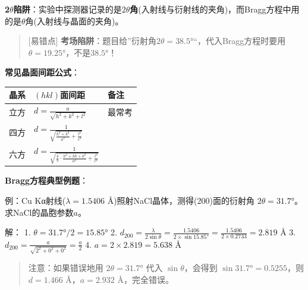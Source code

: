 \documentclass[a4paper,11pt]{ctexart}
\newcounter{none}
\newcommand{\箭}{\ensuremath{\rightarrow}}
\newcommand{\左箭}{\ensuremath{\leftarrow}}
\newcommand{\上箭}{\ensuremath{\uparrow}}
\newcommand{\下箭}{\ensuremath{\downarrow}}
\newcommand{\衡}{\ensuremath{\rightleftharpoons}}
\newcommand{\双箭}{\ensuremath{\leftrightarrow}}
\newcommand{\约等于}{\ensuremath{\approx}}
\newcommand{\小于等于}{\ensuremath{\leq}}
\newcommand{\大于等于}{\ensuremath{\geq}}
\newcommand{\不等于}{\ensuremath{\neq}}
\newcommand{\西格马}{\ensuremath{\sigma}}
\newcommand{\派}{\ensuremath{\pi}}
\begin{document}
\textbf{2\(\theta\)陷阱}：实验中探测器记录的是\textbf{\(2\theta\)角}(入射线与衍射线的夹角)，而Bragg方程中用的是\(\theta\)角(入射线与晶面的夹角)。

\begin{quote}
{[}易错点{]} \textbf{考场陷阱}：题目给''衍射角\(2\theta = 38.5°\)``，代入Bragg方程时要用\(\theta = 19.25°\)，不是\(38.5°\)！
\end{quote}

\textbf{常见晶面间距公式}：

{\def\LTcaptype{none} %
\begin{longtable}[]{@{}
  >{\raggedright\arraybackslash}p{}
  >{\raggedright\arraybackslash}p{}
  >{\raggedright\arraybackslash}p{}@{}}
\toprule\noalign{}
\begin{minipage}[b]{\linewidth}\raggedright
晶系
\end{minipage} & \begin{minipage}[b]{\linewidth}\raggedright
\((hkl)\)面间距
\end{minipage} & \begin{minipage}[b]{\linewidth}\raggedright
备注
\end{minipage} \\
\midrule\noalign{}
\endhead
\bottomrule\noalign{}
\endlastfoot
立方 & \(d = \frac{a}{\sqrt{h^2+k^2+l^2}}\) & 最常考 \\
四方 & \(d = \frac{1}{\sqrt{\frac{h^2+k^2}{a^2}+\frac{l^2}{c^2}}}\) & \\
六方 & \(d = \frac{1}{\sqrt{\frac{4}{3}\cdot\frac{h^2+hk+k^2}{a^2}+\frac{l^2}{c^2}}}\) & \\
\end{longtable}
}

\textbf{Bragg方程典型例题}：

例：Cu Kα射线(\(\lambda = 1.5406\) Å)照射NaCl晶体，测得(200)面的衍射角 \(2\theta = 31.7°\)。求NaCl的晶胞参数\(a\)。

解：
1. \(\theta = 31.7° / 2 = 15.85°\)
2. \(d_{200} = \frac{\lambda}{2\sin\theta} = \frac{1.5406}{2 \times \sin 15.85°} = \frac{1.5406}{2 \times 0.2733} = 2.819\) Å
3. \(d_{200} = \frac{a}{\sqrt{2^2+0^2+0^2}} = \frac{a}{2}\)
4. \(a = 2 \times 2.819 = 5.638\) Å

\begin{quote}
注意：如果错误地用 \(2\theta = 31.7°\) 代入 \(\sin\theta\)，会得到 \(\sin 31.7° = 0.5255\)，则 \(d = 1.466\) Å，\(a = 2.932\) Å，完全错误。
\end{quote}
\end{document}
